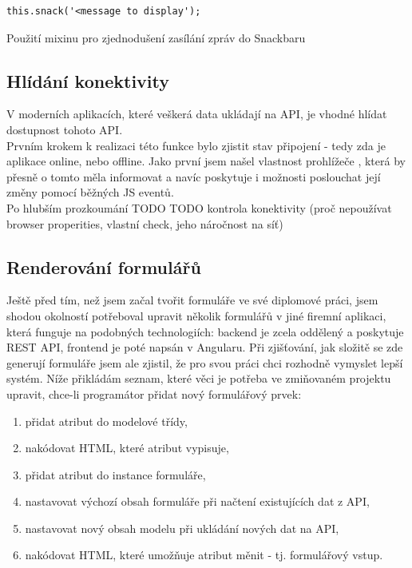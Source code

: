 \begin{listing}[h]
\begin{verbatim}
this.snack('<message to display');
\end{verbatim}
\caption{Použití mixinu pro zjednodušení zasílání zpráv do Snackbaru} \label{code:snack-mixin}
\end{listing}


\subsection{Hlídání konektivity}

V moderních aplikacích, které veškerá data ukládají na API, je vhodné hlídat dostupnost tohoto API.\\
Prvním krokem k realizaci této funkce bylo zjistit stav připojení - tedy zda je aplikace online, nebo offline. Jako první jsem našel vlastnost prohlížeče  \cite{online}, která by přesně o tomto měla informovat a navíc poskytuje i možnosti poslouchat její změny pomocí běžných JS eventů.\\
Po hlubším prozkoumání TODO
TODO kontrola konektivity (proč nepoužívat browser properities, vlastní check, jeho náročnost na síť)


\subsection{Renderování formulářů} \label{implementation:formRender}

Ještě před tím, než jsem začal tvořit formuláře ve své diplomové práci, jsem shodou okolností potřeboval upravit několik formulářů v jiné firemní aplikaci, která funguje na podobných technologiích: backend je zcela oddělený a poskytuje REST API, frontend je poté napsán v Angularu. Při zjišťování, jak složitě se zde generují formuláře jsem ale zjistil, že pro svou práci chci rozhodně vymyslet lepší systém. Níže přikládám seznam, které věci je potřeba ve zmiňovaném projektu upravit, chce-li programátor přidat nový formulářový prvek:

\begin{enumerate}
    \item přidat atribut do modelové třídy,
    \item nakódovat HTML, které atribut vypisuje,
    \item přidat atribut do instance formuláře,
    \item nastavovat výchozí obsah formuláře při načtení existujících dat z API,
    \item nastavovat nový obsah modelu při ukládání nových dat na API,
    \item nakódovat HTML, které umožňuje atribut měnit - tj. formulářový vstup.
\end{enumerate}

